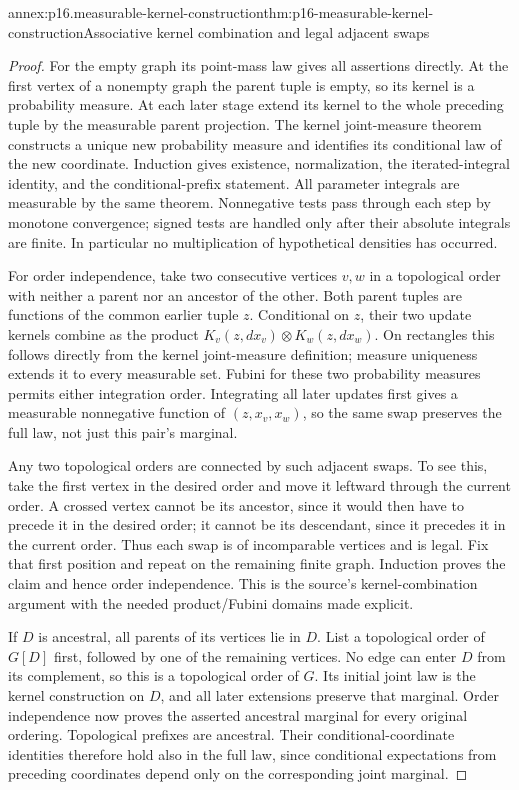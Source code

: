 \begin{annexitem}{annex:p16.measurable-kernel-construction}{thm:p16-measurable-kernel-construction}{Associative kernel combination and legal adjacent swaps}
\begin{proof}
For the empty graph its point-mass law gives all assertions directly.
At the first vertex of a nonempty graph the parent tuple is empty, so its kernel is a
probability measure. At each later stage extend its kernel to the whole
preceding tuple by the measurable parent projection. The kernel
joint-measure theorem constructs a unique new probability measure and
identifies its conditional law of the new coordinate. Induction gives
existence, normalization, the iterated-integral identity, and the
conditional-prefix statement. All parameter integrals are measurable by
the same theorem. Nonnegative tests pass through each step by monotone
convergence; signed tests are handled only after their absolute integrals
are finite. In particular no multiplication of hypothetical densities
has occurred.

For order independence, take two consecutive vertices \(v,w\) in a
topological order with neither a parent nor an ancestor of the other.
Both parent tuples are functions of the common earlier tuple \(z\).
Conditional on \(z\), their two update kernels combine as the product
\(K_v(z,dx_v)\otimes K_w(z,dx_w)\). On rectangles this follows
directly from the kernel joint-measure definition; measure uniqueness
extends it to every measurable set. Fubini for these two probability
measures permits either integration order. Integrating all later
updates first gives a measurable nonnegative function of \((z,x_v,x_w)\),
so the same swap preserves the full law, not just this pair's marginal.

Any two topological orders are connected by such adjacent swaps. To see
this, take the first vertex in the desired order and move it leftward
through the current order. A crossed vertex cannot be its ancestor,
since it would then have to precede it in the desired order; it cannot
be its descendant, since it precedes it in the current order. Thus each
swap is of incomparable vertices and is legal. Fix that first position
and repeat on the remaining finite graph. Induction proves the claim
and hence order independence. This is the source's kernel-combination
argument with the needed product/Fubini domains made explicit.

If \(D\) is ancestral, all parents of its vertices lie in \(D\).
List a topological order of \(G[D]\) first, followed by one of the
remaining vertices. No edge can enter \(D\) from its complement,
so this is a topological order of \(G\). Its initial joint law is
the kernel construction on \(D\), and all later extensions preserve
that marginal. Order independence now proves the asserted ancestral
marginal for every original ordering. Topological prefixes are
ancestral. Their conditional-coordinate identities therefore hold
also in the full law, since conditional expectations from preceding
coordinates depend only on the corresponding joint marginal.
\end{proof}
\end{annexitem}

